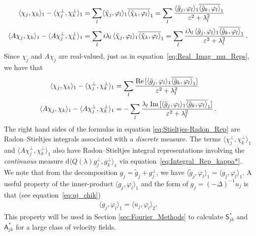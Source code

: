 \documentclass[leqno,onefignum,onetabnum]{siamltex1213}
\renewcommand{\d}{\mathrm{d}}
\newcommand\Real{\mbox{Re}\,} %
\newcommand\Imag{\mbox{Im}\,} %
\newcommand{\Sm}{\mathsf{S}}
\newcommand{\Am}{\mathsf{A}}
\newcommand{\chit}{\tilde{\chi}}
\newcommand{\gt}{\tilde{g}}
\begin{document}
%
\begin{align}%
  \langle\chi_j,\chi_k\rangle_1-\langle\chi_j^\perp,\chi_k^\perp\rangle_1&=\sum_l\langle\chit_j,\varphi_l\rangle_1\overline{\langle\chit_k,\varphi_l\rangle}_1
         =\sum_l\frac{\langle\gt_j,\varphi_l\rangle_1\overline{\langle\gt_k,\varphi_l\rangle}_1}{\varepsilon^2+\lambda_l^2}
         \\
  \langle A\chi_j,\chi_k\rangle_1-\langle A\chi_j^\perp,\chi_k^\perp\rangle_1&=\sum_l\imath\lambda_l\,\langle\chit_j,\varphi_l\rangle_1\overline{\langle\chit_k,\varphi_l\rangle}_1
         =\sum_l\frac{\imath\lambda_l\,\langle\gt_j,\varphi_l\rangle_1\overline{\langle\gt_k,\varphi_l\rangle}_1}{\varepsilon^2+\lambda_l^2}\,.
         \notag
\end{align}
%
Since $\chi_j$ and $A\chi_j$ are real-valued, just as in
equation~\eqref{eq:Real_Imag_mu_Reps}, we have that
%
\begin{align}\label{eq:Stieltjes-Radon_Rep}
  \langle\chi_j,\chi_k\rangle_1-\langle\chi_j^\perp,\chi_k^\perp\rangle_1&=\sum_l\frac{\Real[\langle\gt_j,\varphi_l\rangle_1\overline{\langle\gt_k,\varphi_l\rangle}_1]}{\varepsilon^2+\lambda_l^2}
         \\
  \langle A\chi_j,\chi_k\rangle_1-\langle A\chi_j^\perp,\chi_k^\perp\rangle_1&=-\sum_l\frac{\lambda_l\;\Imag[\langle\gt_j,\varphi_l\rangle_1\overline{\langle\gt_k,\varphi_l\rangle}_1]}{\varepsilon^2+\lambda_l^2}\,.
         \notag
\end{align}
%
The right hand sides of the formulas in equation
\eqref{eq:Stieltjes-Radon_Rep} are Radon--Stieltjes integrals
associated with a \emph{discrete} measure. The terms $\langle\chi_j^\perp,\chi_k^\perp\rangle_1$ and
$\langle A\chi_j^\perp,\chi_k^\perp\rangle_1$ also have Radon--Stieltjes integral representations
involving the \emph{continuous} measure $\d\langle Q(\lambda)g_j^\perp,g_k^\perp\rangle_1$
via equation~\eqref{eq:Integral_Rep_kappa*}. We note that from the 
decomposition $g_j=\gt_j+g^\perp_j$, we have
$\langle\gt_j,\varphi_l\rangle_1=\langle g_j,\varphi_l\rangle_1$. A useful property of the inner-product
$\langle g_j,\varphi_l\rangle_1$ and the form of $g_j=(-\Delta)^{-1}u_j$ is that (see equation~\eqref{eq:uj_chik})
%
\begin{align}\label{eq:H1_L2}
  \langle g_j,\varphi_l\rangle_1=\langle u_j,\varphi_l\rangle_2.
\end{align}
%
This property will
be used in Section \ref{sec:Fourier_Methods} to calculate $\Sm^*_{jk}$
and $\Am^*_{jk}$ for a large class of velocity fields.   
\end{document}
